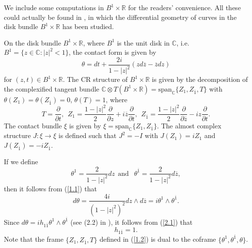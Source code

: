 \documentclass{amsart}
\theoremstyle{Corollary}
\numberwithin{equation}{section}
\begin{document}
We include some computations in $B^1\times\mathbb{R}$ for the readers' convenience. 
All these could actually be found in \cite{HH}, in which 
the differential geometry of curves in the disk bundle $B^1\times\mathbb{R}$ has been studied. 

On the disk bundle $B^1\times \mathbb{R}$, 
where $B^1$ is the unit disk in $\mathbb{C}$, i.e. 
$B^1=\{z\in \mathbb{C}: |z|^2<1\}$, 
the contact form is given by 
\begin{equation}\label{1.1}
\theta=dt+\frac{2i}{1-|z|^2}(zd\overline{z}-\overline{z}dz)
\end{equation}
for $(z,t)\in B^1\times \mathbb{R}$. 
The CR structure of $B^1\times\mathbb{R}$
is given by the decomposition of 
the complexified tangent bundle $\mathbb{C}\otimes T(B^1\times\mathbb{R})
=\mbox{span}_{\mathbb{C}}\{Z_1,Z_{\overline{1}}, T\}$
with $\theta(Z_1)=\theta(Z_{\overline{1}})=0$, 
$\theta(T)=1$, where 
\begin{equation}\label{1.2}
T=\frac{\partial}{\partial t},~~
Z_1=\frac{1-|z|^2}{2}\frac{\partial}{\partial z}+i\overline{z}\frac{\partial}{\partial t},~~
Z_{\overline{1}}=\frac{1-|z|^2}{2}\frac{\partial}{\partial \overline{z}}-iz\frac{\partial}{\partial t}.
\end{equation}
The contact bundle $\xi$ is given by $\xi=\mbox{span}_{\mathbb{C}}\{Z_1,Z_{\overline{1}}\}$. 
The almost complex structure $J:\xi\to\xi$
is defined such that $J^2=-I$
with $J(Z_1)=iZ_1$ and $J(Z_{\overline{1}})=-iZ_{\overline{1}}$. 


If we define 
\begin{equation}\label{2.0}
\theta^1=\frac{2}{1-|z|^2}dz~~\mbox{
and }~~\theta^{\overline{1}}=\frac{2}{1-|z|^2}d\overline{z},
\end{equation}
then it follows from (\ref{1.1}) that 
\begin{equation}\label{2.1}
d\theta=\frac{4i}{(1-|z|^2)^2}dz\wedge d\overline{z}=i\theta^1\wedge \theta^{\overline{1}}.
\end{equation}
Since $d\theta=ih_{1\overline{1}}\theta^1\wedge \theta^{\overline{1}}$ (see (2.2) in \cite{Lee}), it follows from (\ref{2.1}) that 
\begin{equation}\label{2.11}
h_{1\overline{1}}=1.
\end{equation}
Note that the frame $\{Z_1,Z_{\overline{1}},T\}$ defined in (\ref{1.2})
is dual to the coframe $\{\theta^1,\theta^{\overline{1}}, \theta\}$. 
\end{document}
